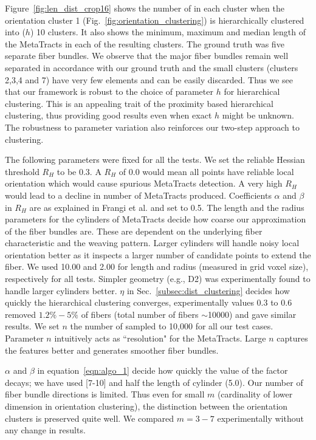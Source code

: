 Figure~\ref{fig:len_dist_crop16} shows the number of \mt in each cluster when the orientation cluster 1 (Fig.~\ref{fig:orientation_clustering}) is hierarchically clustered into ($h$) 10 clusters. It also shows the minimum, maximum and median length of the MetaTracts in each of the resulting clusters. The ground truth was five separate fiber bundles. We observe that the major fiber bundles remain well separated in accordance with our ground truth and the small clusters (clusters 2,3,4 and 7) have very few elements and can be easily discarded. Thus we see that our framework is robust to the choice of parameter $h$ for hierarchical clustering. This is an appealing trait of the proximity based hierarchical clustering, thus providing good results even when exact $h$ might be unknown. The robustness to parameter variation also reinforces our two-step approach to clustering. 


The following parameters were fixed for all the tests. We set the reliable Hessian threshold $R_{H}$ to be 0.3. A $R_{H}$ of 0.0 would mean all points have reliable local orientation which would cause spurious MetaTracts detection. A very high $ R_{H}$ would lead to a decline in number of MetaTracts produced. Coefficients $\alpha$ and $\beta$ in $R_{H}$ are as explained in Frangi et al. \cite{Frangi1998} and set to 0.5. The length and the radius parameters for the cylinders of MetaTracts decide how coarse our approximation of the fiber bundles are. These are dependent on the underlying fiber characteristic and the weaving pattern. Larger cylinders will handle noisy local orientation better as it inspects a larger number of candidate points to extend the fiber. We used 10.00 and 2.00 for length and radius (measured in grid voxel size), respectively for all tests.  
Simpler geometry (e.g., D2) was experimentally found to handle larger cylinders better. $\eta$ in Sec.~\ref{subsec:dist_clustering} decides how quickly the hierarchical clustering converges, experimentally values 0.3 to 0.6 removed $1.2\% - 5\%$ of fibers (total number of fibers $\sim$10000) and gave similar results. We set $n$ the number of sampled \mt to 10,000 for all our test cases. Parameter $n$ intuitively acts as ``resolution" for the MetaTracts. Large $n$ captures the features better and generates smoother fiber bundles. 

$\alpha$ and $\beta$ in equation~\ref{eqn:algo_1} decide how quickly the value of the factor decays; we have used [7-10] and half the length of cylinder (5.0). Our number of fiber bundle directions is limited. Thus even for small $m$ (cardinality of lower dimension in orientation clustering), the distinction between the orientation clusters is preserved quite well. We compared  $m=3-7$ experimentally without any change in results. 
